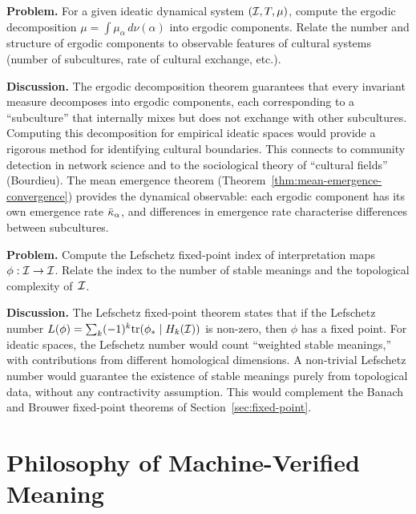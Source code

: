 \begin{game}
\label{op:ergodic-decomposition}
\textbf{Problem.}  For a given ideatic dynamical system $(\mathcal{I}, T, \mu)$,
compute the ergodic decomposition $\mu = \int \mu_\alpha\, d\nu(\alpha)$
into ergodic components.  Relate the number and structure of ergodic
components to observable features of cultural systems (number of
subcultures, rate of cultural exchange, etc.).

\textbf{Discussion.}  The ergodic decomposition theorem guarantees that
every invariant measure decomposes into ergodic components, each
corresponding to a ``subculture'' that internally mixes but does not
exchange with other subcultures.  Computing this decomposition for
empirical ideatic spaces would provide a rigorous method for identifying
cultural boundaries.  This connects to community detection in network
science and to the sociological theory of ``cultural fields'' (Bourdieu).
The mean emergence theorem (Theorem~\ref{thm:mean-emergence-convergence})
provides the dynamical observable: each ergodic component has its own
emergence rate $\bar{\kappa}_\alpha$, and differences in emergence
rate characterise differences between subcultures.
\end{game}

\begin{game}
\label{op:fixed-point-index}
\textbf{Problem.}  Compute the Lefschetz fixed-point index of
interpretation maps $\phi : \mathcal{I} \to \mathcal{I}$.  Relate the index to the
number of stable meanings and the topological complexity of~$\mathcal{I}$.

\textbf{Discussion.}  The Lefschetz fixed-point theorem states that
if the Lefschetz number $L(\phi) = \sum_k (-1)^k \mathrm{tr}(\phi_*
\mid H_k(\mathcal{I}))$ is non-zero, then $\phi$ has a fixed point.  For
ideatic spaces, the Lefschetz number would count ``weighted stable
meanings,'' with contributions from different homological dimensions.
A non-trivial Lefschetz number would guarantee the existence of
stable meanings purely from topological data, without any
contractivity assumption.  This would complement the Banach and
Brouwer fixed-point theorems of Section~\ref{sec:fixed-point}.
\end{game}

\section{Philosophy of Machine-Verified Meaning}
\label{sec:philosophy-verification}

